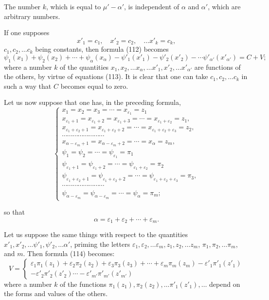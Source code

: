 \documentclass{article}
\begin{document}
The number $k$, which is equal to $\mu'-\alpha'$, is independent of $\alpha$ and $\alpha'$, which are arbitrary numbers.

If one supposes
\[ x'_1 = c_1, \quad x'_2 = c_2, \quad \ldots x'_k = c_k, \tag{113} \]
$c_1, c_2, \ldots c_k$ being constants, then formula (112) becomes
\[ \psi_1(x_1)+\psi_2(x_2)+\cdots+\psi_\alpha(x_\alpha)-\psi'_1(x'_1)-\psi'_2(x'_2)-\cdots\psi'_{\alpha'}(x'_{\alpha'}) = C+V; \tag{114} \]
where a number $k$ of the quantities $x_1, x_2, \ldots x_\alpha, \ldots x'_1, x'_2, \ldots x'_{\alpha'}$ are functions of the others, by virtue of equations (113). It is clear that one can take $c_1, c_2, \ldots c_k$ in such a way that $C$ becomes equal to zero.

Let us now suppose that one has, in the preceding formula,
\[ \begin{cases}
x_1 = x_2 = x_3 = \cdots = x_{\varepsilon_1} = z_1 \\
x_{\varepsilon_1+1} = x_{\varepsilon_1+2} = x_{\varepsilon_1+3} = \cdots = x_{\varepsilon_1+\varepsilon_2} = z_1, \\
x_{\varepsilon_1+\varepsilon_2+1} = x_{\varepsilon_1+\varepsilon_2+2} = \cdots = x_{\varepsilon_1+\varepsilon_2+\varepsilon_3} = z_2, \\
\cdots\cdots\cdots\cdots\cdots\cdots\cdots\cdots \\
x_{\alpha-\varepsilon_m+1} = x_{\alpha-\varepsilon_m+2} = \cdots = x_\alpha = z_m, \\
\psi_1 = \psi_2 = \cdots = \psi_{\varepsilon_1} = \pi_1 \\
\psi_{\varepsilon_1+1} = \psi_{\varepsilon_1+2} = \cdots = \psi_{\varepsilon_1+\varepsilon_2} = \pi_2 \\
\psi_{\varepsilon_1+\varepsilon_2+1} = \psi_{\varepsilon_1+\varepsilon_2+2} = \cdots = \psi_{\varepsilon_1+\varepsilon_2+\varepsilon_3} = \pi_3, \\
\cdots\cdots\cdots\cdots\cdots\cdots\cdots\cdots \\
\psi_{\alpha-\varepsilon_m} = \psi_{\alpha-\varepsilon_m} = \cdots = \psi_\alpha = \pi_m;
\end{cases} \tag{115} \]

so that
\[ \alpha = \varepsilon_1+\varepsilon_2+\cdots+\varepsilon_m. \]

Let us suppose the same things with respect to the quantities $x'_1, x'_2, \ldots \psi'_1, \psi'_2, \ldots \alpha'$, priming the letters $\varepsilon_1, \varepsilon_2, \ldots \varepsilon_m, z_1, z_2, \ldots z_m$, $\pi_1, \pi_2, \ldots \pi_m$, and $m$. Then formula (114) becomes:
\[ V = \begin{cases} \varepsilon_1\pi_1(z_1)+\varepsilon_2\pi_2(z_2)+\varepsilon_3\pi_3(z_3)+\cdots+\varepsilon_m\pi_m(z_m)-\varepsilon'_1\pi'_1(z'_1) \\ -\varepsilon'_2\pi'_2(z'_2)\cdots-\varepsilon'_{m'}\pi'_{m'}(z'_{m'}) \end{cases} \tag{116} \]
where a number $k$ of the functions $\pi_1(z_1), \pi_2(z_2), \ldots \pi'_1(z'_1), \ldots$ depend on the forms and values of the others.
\end{document}
